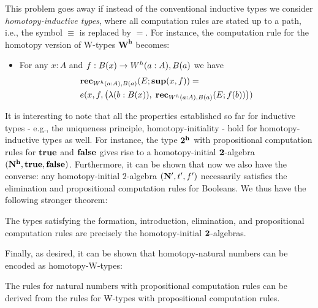 This problem goes away if instead of the conventional inductive types we consider \emph{homotopy-inductive types}, where all computation rules are stated up to a path, i.e., the symbol $\equiv$ is replaced by $=$. For instance, the computation rule for the homotopy version of W-types $\mathbf{W^h}$ becomes:
\begin{itemize}
\item For any $x : A$ and $f : B(x) \to W^h(a:A), B(a)$ we have 
\begin{align*}
& \mathbf{rec}_{W^h(a:A), B(a)}(E;\mathbf{sup}(x,f)) = \\ & e(x,f,\big(\lambda (b : B(x)), \; \mathbf{rec}_{W^h(a:A), B(a)}(E;f(b))\big))
\end{align*}
\end{itemize}

It is interesting to note that all the properties established so far for inductive types - e.g., the uniqueness principle, homotopy-initiality - hold for homotopy-inductive types as well. For instance, the type $\mathbf{2^h}$ with propositional computation rules for $\mathbf{true}$ and $\mathbf{false}$ gives rise to a homotopy-initial $\mathbf{2}$-algebra $(\mathbf{N^h}, \mathbf{true}, \mathbf{false})$. Furthermore, it can be shown that now we also have the converse: any homotopy-initial $2$-algebra $(\mathbf{N}',t',f')$ necessarily satisfies the elimination and propositional computation rules for Booleans. We thus have the following stronger theorem:

\begin{thm}
The types satisfying the formation, introduction, elimination, and propositional computation rules are precisely the homotopy-initial $\mathbf{2}$-algebras.
\end{thm}

Finally, as desired, it can be shown that homotopy-natural numbers can be encoded as homotopy-W-types:

\begin{thm}
The rules for natural numbers with propositional computation rules can be derived from the rules for W-types with propositional computation rules.
\end{thm}


%
%
%

